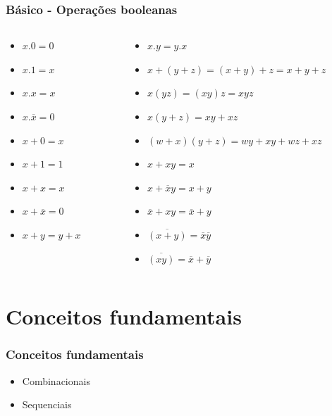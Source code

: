 \documentclass{beamer}
\begin{document}
\begin{frame}
  \frametitle{Básico - Operações booleanas}
\begin{columns}[c]
  \begin{column}{3cm}
   \begin{itemize}
   \item $x.0 = 0 $  \pause
   \item $x.1 = x $  \pause 
   \item $x.x = x $  \pause
   \item $x.\overline{x} = 0 $  \pause
   \item $x + 0 = x $  \pause
   \item $x + 1 = 1 $  \pause 
   \item $x + x = x $  \pause 
   \item $x + \overline{x} = 0 $  \pause 
   \item $x + y = y + x $  \pause 
  \end{itemize}
 \end{column} 
  
  \begin{column}{7cm}
   \begin{itemize}
   \item $x.y = y.x $  \pause
   \item $x + (y + z) = (x + y) + z = x + y + z $  \pause 
   \item $x(yz) = (xy)z = xyz $  \pause
   \item $x(y + z) = xy + xz $  \pause
   \item $(w + x)(y + z) = wy + xy + wz + xz$  \pause
   \item $x + xy = x $  \pause 
   \item $x + \overline{x}y = x + y $  \pause 
   \item $\overline{x} + xy = \overline{x} + y$  \pause 
   \item $\overline{(x + y)} = \overline{x}\overline{y} $  \pause 
   \item $\overline{(xy)} = \overline{x} + \overline{y} $   
  \end{itemize}
  \end{column}
\end{columns}
\end{frame}

\section{Conceitos fundamentais}
\begin{frame}
 \frametitle{Conceitos fundamentais}
 \begin{itemize}
  \item Combinacionais
  \item Sequenciais
 \end{itemize}
\end{frame}
\end{document}
